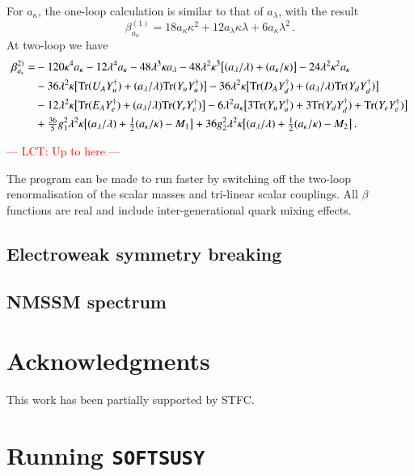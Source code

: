 \documentclass[final,3p,times,pdflatex]{elsarticle}
\def\SOFTSUSY{{\tt SOFTSUSY}}
\newcommand{\lamsq}{\lambda^2}
\newcommand{\kapsq}{\kappa^2}
\newcommand{\tr}{\mathrm{Tr}}
\newcommand{\Alam}{a_\lambda/\lambda}
\newcommand{\Akap}{a_\kappa/\kappa}
\begin{document}
For $a_\kappa$, the one-loop calculation is similar to that of $a_\lambda$, with 
the result
%
\begin{equation}
\beta_{a_\kappa}^{(1)} = 18a_\kappa\kappa^2 + 12a_\lambda\kappa\lambda 
+ 6a_\kappa\lamsq\,.
\end{equation}
%
At two-loop we have
%
\begin{align}
\beta_{a_\kappa}^{2)} =& -120\kappa^4 a_\kappa - 12\lambda^4 a_\kappa 
- 48\lambda^3\kappa a_\lambda - 48\lamsq\kappa^3\big[ (\Alam) + (\Akap)\big]
-24\lamsq\kapsq a_\kappa \notag \\
%
&-36\lamsq\kappa\big[ \tr( U_A Y_u^\dagger) + (\Alam)\tr( Y_u Y_u^\dagger)\big]
-36\lamsq\kappa\big[ \tr( D_A Y_d^\dagger) + (\Alam)\tr( Y_d Y_d^\dagger)\big] 
\notag \\
%
&-12\lamsq\kappa\big[ \tr( E_A Y_e^\dagger) + (\Alam)\tr( Y_e Y_e^\dagger)\big]
-6\lamsq a_\kappa\big[ 3\tr( Y_u Y_u^\dagger) + 3\tr( Y_d Y_d^\dagger) 
+ \tr( Y_e Y_e^\dagger) \big] \notag \\
%
&+ \tfrac{36}{5}g_1^2\lamsq\kappa\big[ (\Alam) + \tfrac{1}{2}(\Akap) - M_1\big] 
+ 36g_2^2\lamsq \kappa\big[ (\Alam) + \tfrac{1}{2}(\Akap) - M_2 \big]\,.
\end{align}

\textcolor{red}{--- LCT: Up to here ---}

The program 
can be made to run faster by switching off the two-loop renormalisation of 
the scalar masses and tri-linear scalar couplings. All
$\beta$ functions are real and include inter-generational quark mixing
effects. 

\subsection{Electroweak symmetry breaking \label{ewsb}}


\subsection{NMSSM spectrum \label{spec}}



\section*{Acknowledgments}
This work has been partially supported by 
STFC\@. 


\appendix

\section{Running \SOFTSUSY}
\label{sec:run}
\end{document}
